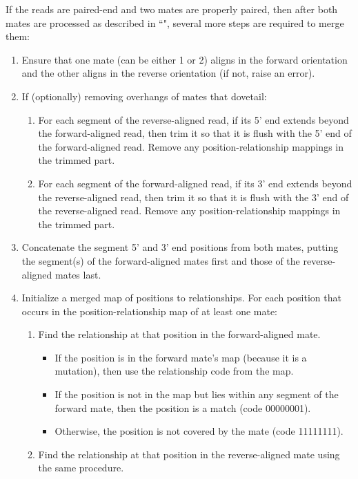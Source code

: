\documentclass{article}
\begin{document}
If the reads are paired-end and two mates are properly paired, then after both mates are processed as described in ``", several more steps are required to merge them:
\begin{enumerate}
    \item Ensure that one mate (can be either 1 or 2) aligns in the forward orientation and the other aligns in the reverse orientation (if not, raise an error).
    \item If (optionally) removing overhangs of mates that dovetail:
    \begin{enumerate}
        \item For each segment of the reverse-aligned read, if its 5' end extends beyond the forward-aligned read, then trim it so that it is flush with the 5' end of the forward-aligned read. Remove any position-relationship mappings in the trimmed part.
        \item For each segment of the forward-aligned read, if its 3' end extends beyond the reverse-aligned read, then trim it so that it is flush with the 3' end of the reverse-aligned read. Remove any position-relationship mappings in the trimmed part.
    \end{enumerate}
    \item Concatenate the segment 5' and 3' end positions from both mates, putting the segment(s) of the forward-aligned mates first and those of the reverse-aligned mates last.
    \item Initialize a merged map of positions to relationships. For each position that occurs in the position-relationship map of at least one mate:
    \begin{enumerate}
        \item Find the relationship at that position in the forward-aligned mate.
        \begin{itemize}
            \item If the position is in the forward mate's map (because it is a mutation), then use the relationship code from the map.
            \item If the position is not in the map but lies within any segment of the forward mate, then the position is a match (code 00000001).
            \item Otherwise, the position is not covered by the mate (code 11111111).
        \end{itemize}
        \item Find the relationship at that position in the reverse-aligned mate using the same procedure.

\end{enumerate}
\end{enumerate}
\end{document}
